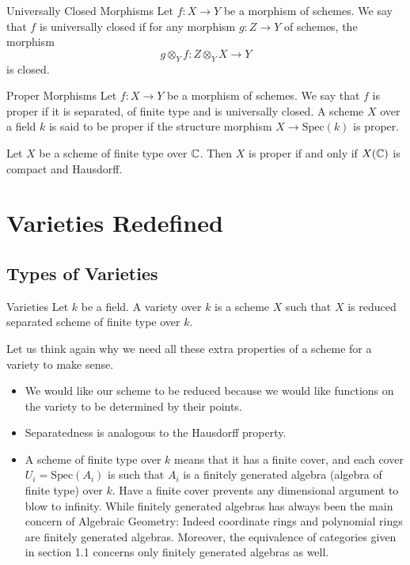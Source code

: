 \documentclass[a4paper]{article}
\begin{document}
\begin{defn}{Universally Closed Morphisms}{} Let $f:X\to Y$ be a morphism of schemes. We say that $f$ is universally closed if for any morphism $g:Z\to Y$ of schemes, the morphism $$g\otimes_Yf:Z\otimes_YX\to Y$$ is closed. 
\end{defn}

\begin{defn}{Proper Morphisms}{} Let $f:X\to Y$ be a morphism of schemes. We say that $f$ is proper if it is separated, of finite type and is universally closed. A scheme $X$ over a field $k$ is said to be proper if the structure morphism $X\to\text{Spec}(k)$ is proper. 
\end{defn}

\begin{thm}{}{} Let $X$ be a scheme of finite type over $\mathbb{C}$. Then $X$ is proper if and only if $X(\mathbb{C})$ is compact and Hausdorff. 
\end{thm}

\pagebreak
\section{Varieties Redefined}
\subsection{Types of Varieties}
\begin{defn}{Varieties}{} Let $k$ be a field. A variety over $k$ is a scheme $X$ such that $X$ is reduced separated scheme of finite type over $k$. 
\end{defn}

Let us think again why we need all these extra properties of a scheme for a variety to make sense. 
\begin{itemize}
\item We would like our scheme to be reduced because we would like functions on the variety to be determined by their points. 
\item Separatedness is analogous to the Hausdorff property. 
\item A scheme of finite type over $k$ means that it has a finite cover, and each cover $U_i=\text{Spec}(A_i)$ is such that $A_i$ is a finitely generated algebra (algebra of finite type) over $k$. Have a finite cover prevents any dimensional argument to blow to infinity. While finitely generated algebras has always been the main concern of Algebraic Geometry: Indeed coordinate rings and polynomial rings are finitely generated algebras. Moreover, the equivalence of categories given in section 1.1 concerns only finitely generated algebras as well. 
\end{itemize}
\end{document}
